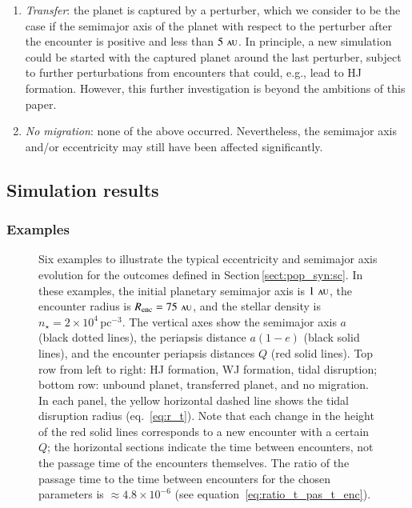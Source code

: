 \documentclass[iop,usenatbib]{emulateapj}
\renewcommand{\S}{Section}
\newcommand{\au}{\,\textsc{au}}
\newcommand{\renc}{R_\mathrm{enc}}
\begin{document}
\begin{enumerate}
\item {\it Transfer}: the planet is captured by a perturber, which we consider to be the case if the semimajor axis of the planet with respect to the perturber after the encounter is positive and less than $5\,\au$. In principle, a new simulation could be started with the captured planet around the last perturber, subject to further perturbations from encounters that could, e.g., lead to HJ formation. However, this further investigation is beyond the ambitions of this paper. 

\item {\it No migration}: none of the above occurred. Nevertheless, the semimajor axis and/or eccentricity may still have been affected significantly.

\end{enumerate}


\subsection{Simulation results}
\label{sect:pop_syn:results}

\subsubsection{Examples}
\label{sect:pop_syn:example}

\begin{figure*}
\center
\iftoggle{ApJFigs}{
\texttt{[image: examples3\_run05\_ex.eps]}
}{
\texttt{[image: figs/examples3\_run05\_ex.eps]}
}
\caption { Six examples to illustrate the typical eccentricity and semimajor axis evolution for the outcomes defined in \S\,\ref{sect:pop_syn:sc}. In these examples, the initial planetary semimajor axis is $1\,\au$, the encounter radius is $\renc = 75\,\au$, and the stellar density is $n_\star = 2 \times 10^4 \, \mathrm{pc^{-3}}$. The vertical axes show the semimajor axis $a$ (black dotted lines), the periapsis distance $a(1-e)$ (black solid lines), and the encounter periapsis distances $Q$ (red solid lines). Top row from left to right: HJ formation, WJ formation, tidal disruption; bottom row: unbound planet, transferred planet, and no migration. In each panel, the yellow horizontal dashed line shows the tidal disruption radius (eq.~\ref{eq:r_t}). Note that each change in the height of the red solid lines corresponds to a new encounter with a certain $Q$; the horizontal sections indicate the time between encounters, not the passage time of the encounters themselves. The ratio of the passage time to the time between encounters for the chosen parameters is $\approx 4.8 \times 10^{-6}$ (see equation~\ref{eq:ratio_t_pas_t_enc}). }
\label{fig:examples}
\end{figure*}
\end{document}
